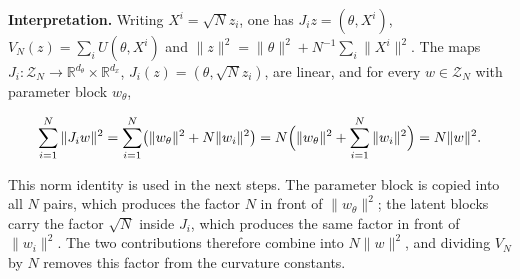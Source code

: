 \documentclass[11pt,a4paper]{report}
\begin{document}
\textbf{Interpretation.} Writing \(X^i=\sqrt Nz_i\), one has \(J_iz=(\theta,X^i)\), \(V_N(z)=\sum_iU(\theta,X^i)\) and \(\|z\|^2=\|\theta\|^2+N^{-1}\sum_i\|X^i\|^2\). The maps \(J_i:\mathcal Z_N\to\mathbb R^{d_\theta}\times\mathbb R^{d_x}\), \(J_i(z)=(\theta,\sqrt Nz_i)\), are linear, and for every \(w\in\mathcal Z_N\) with parameter block \(w_\theta\),


\[\sum_{i=1}^N\|J_iw\|^2=\sum_{i=1}^N\bigl(\|w_\theta\|^2+N\|w_i\|^2\bigr)=N\Bigl(\|w_\theta\|^2+\sum_{i=1}^N\|w_i\|^2\Bigr)=N\|w\|^2.\]


This norm identity is used in the next steps. The parameter block is copied into all \(N\) pairs, which produces the factor \(N\) in front of \(\|w_\theta\|^2\); the latent blocks carry the factor \(\sqrt N\) inside \(J_i\), which produces the same factor in front of \(\|w_i\|^2\). The two contributions therefore combine into \(N\|w\|^2\), and dividing \(V_N\) by \(N\) removes this factor from the curvature constants.
\end{document}
